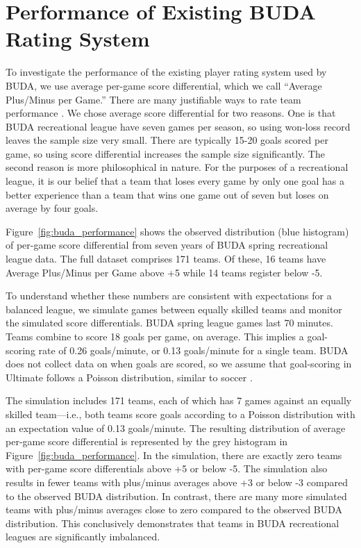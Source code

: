 \section{Performance of Existing BUDA Rating System}\label{sec:existing_performance}

To investigate the performance of the existing player rating system used by BUDA, we use average per-game score differential, which we call ``Average Plus/Minus per Game.'' There are many justifiable ways to rate team performance \cite{Langville_2012}.  We chose average score differential for two reasons.  One is that BUDA recreational league have seven games per season, so using won-loss record leaves the sample size very small.  There are typically 15-20 goals scored per game, so using score differential increases the sample size significantly.  The second reason is more philosophical in nature.  For the purposes of a recreational league, it is our belief that a team that loses every game by only one goal has a better experience than a team that wins one game out of seven but loses on average by four goals.  

Figure~\ref{fig:buda_performance} shows the observed distribution (blue histogram) of per-game score differential from seven years of BUDA spring recreational league data.  The full dataset comprises 171 teams.  Of these, 16 teams have Average Plus/Minus per Game above +5 while 14 teams register below -5.  

To understand whether these numbers are consistent with expectations for a balanced league, we simulate games between equally skilled teams and monitor the simulated score differentials.  BUDA spring league games last 70 minutes.  Teams combine to score 18 goals per game, on average. This implies a goal-scoring rate of 0.26 goals/minute, or 0.13 goals/minute for a single team.  BUDA does not collect data on when goals are scored, so we assume that goal-scoring in Ultimate follows a Poisson distribution, similar to soccer \cite{Heuer_2010}.

The simulation includes 171 teams, each of which has 7 games against an equally skilled team---i.e., both teams score goals according to a Poisson distribution with an expectation value of 0.13 goals/minute. The resulting distribution of average per-game score differential is represented by the grey histogram in Figure~\ref{fig:buda_performance}.  In the simulation, there are exactly zero teams with per-game score differentials above +5 or below -5.  The simulation also results in fewer teams with plus/minus averages above +3 or below -3 compared to the observed BUDA distribution.  In contrast, there are many more simulated teams with plus/minus averages close to zero compared to the observed BUDA distribution.  This conclusively demonstrates that teams in BUDA recreational leagues are significantly imbalanced.

